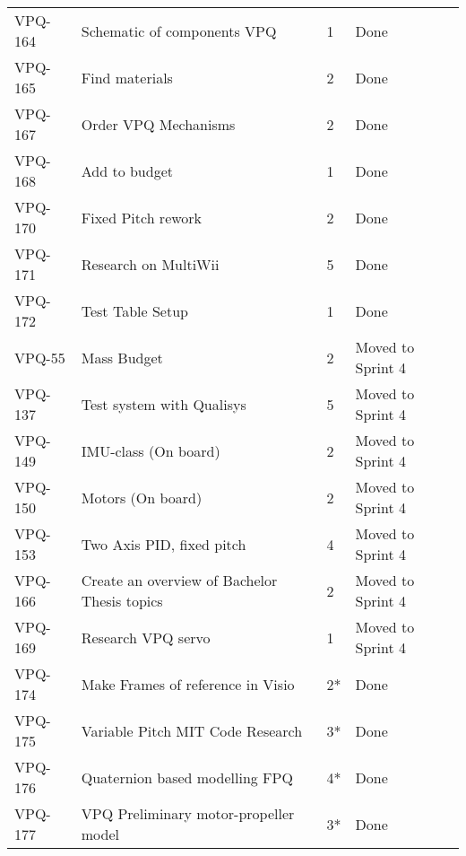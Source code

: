 \begin{table}[ht]
\begin{tabularx}{\linewidth}{|m{1.5cm} m{8.3cm} m{1.5cm} m{3.5cm}|}
\rowcolor{gainsboro} VPQ-164 &  Schematic of components VPQ & 1\centering & Done  \\    
      VPQ-165 & Find materials & 2\centering & Done  \\
\rowcolor{gainsboro}  VPQ-167 &  Order VPQ Mechanisms & 2\centering & Done  \\
      VPQ-168 & Add to budget & 1\centering & Done  \\
\rowcolor{gainsboro} VPQ-170 &  Fixed Pitch rework & 2\centering & Done  \\    
      VPQ-171 & Research on MultiWii & 5\centering & Done  \\
\rowcolor{gainsboro}  VPQ-172 &  Test Table Setup & 1\centering & Done  \\
      VPQ-55 & Mass Budget & 2\centering & Moved to Sprint 4  \\
\rowcolor{gainsboro} VPQ-137 &  Test system with Qualisys & 5\centering & Moved to Sprint 4  \\    
      VPQ-149 & IMU-class (On board) & 2\centering & Moved to Sprint 4  \\
\rowcolor{gainsboro}  VPQ-150 &  Motors (On board) & 2\centering & Moved to Sprint 4  \\
      VPQ-153 & Two Axis PID, fixed pitch & 4\centering & Moved to Sprint 4  \\
\rowcolor{gainsboro} VPQ-166 &  Create an overview of Bachelor Thesis topics & 2\centering & Moved to Sprint 4  \\    
      VPQ-169 & Research VPQ servo & 1\centering & Moved to Sprint 4  \\
\rowcolor{gainsboro}  VPQ-174 &  Make Frames of reference in Visio & 2*\centering & Done  \\
      VPQ-175 & Variable Pitch MIT Code Research & 3*\centering & Done  \\
\rowcolor{gainsboro} VPQ-176 &  Quaternion based modelling FPQ & 4*\centering & Done  \\    
      VPQ-177 & VPQ Preliminary motor-propeller model & 3*\centering & Done  \\
\hline    
\end{tabularx}
\end{table}




